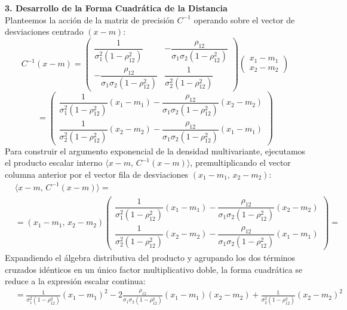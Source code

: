 \begin{ejemplo}[Deducción Explícita para la Dimensión $n = 2$]
\noindent \textbf{3. Desarrollo de la Forma Cuadrática de la Distancia} \\
Planteemos la acción de la matriz de precisión $C^{-1}$ operando sobre el vector de desviaciones centrado $(x-m)$:
\[
C^{-1}(x-m) = \begin{pmatrix} \dfrac{1}{\sigma_1^2 (1 - \rho_{12}^2)} & -\dfrac{\rho_{12}}{\sigma_1 \sigma_2 (1 - \rho_{12}^2)} \\ -\dfrac{\rho_{12}}{\sigma_1 \sigma_2 (1 - \rho_{12}^2)} & \dfrac{1}{\sigma_2^2 (1 - \rho_{12}^2)} \end{pmatrix} \begin{pmatrix} x_1 - m_1 \\ x_2 - m_2 \end{pmatrix}
\]
\[
= \begin{pmatrix} \dfrac{1}{\sigma_1^2 (1 - \rho_{12}^2)}(x_1 - m_1) - \dfrac{\rho_{12}}{\sigma_1 \sigma_2 (1 - \rho_{12}^2)}(x_2 - m_2) \\[0.4cm] \dfrac{1}{\sigma_2^2 (1 - \rho_{12}^2)}(x_2 - m_2) - \dfrac{\rho_{12}}{\sigma_1 \sigma_2 (1 - \rho_{12}^2)}(x_1 - m_1) \end{pmatrix}
\]
Para construir el argumento exponencial de la densidad multivariante, ejecutamos el producto escalar interno $\langle x-m, \, C^{-1}(x-m) \rangle$, premultiplicando el vector columna anterior por el vector fila de desviaciones $(x_1 - m_1, \, x_2 - m_2)$:
\begin{align*}
&\langle x-m, \, C^{-1}(x-m) \rangle = \\
&= (x_1 - m_1, \, x_2 - m_2) \begin{pmatrix} \dfrac{1}{\sigma_1^2 (1 - \rho_{12}^2)}(x_1 - m_1) - \dfrac{\rho_{12}}{\sigma_1 \sigma_2 (1 - \rho_{12}^2)}(x_2 - m_2) \\[0.4cm] \dfrac{1}{\sigma_2^2 (1 - \rho_{12}^2)}(x_2 - m_2) - \dfrac{\rho_{12}}{\sigma_1 \sigma_2 (1 - \rho_{12}^2)}(x_1 - m_1) \end{pmatrix} = 
\end{align*}
Expandiendo el álgebra distributiva del producto y agrupando los dos términos cruzados idénticos en un único factor multiplicativo doble, la forma cuadrática se reduce a la expresión escalar continua:
\begin{align*}
&= \frac{1}{\sigma_1^2 (1 - \rho_{12}^2)} (x_1 - m_1)^2 - 2 \frac{\rho_{12}}{\sigma_1 \sigma_2 (1 - \rho_{12}^2)} (x_1 - m_1)(x_2 - m_2) + \frac{1}{\sigma_2^2 (1 - \rho_{12}^2)} (x_2 - m_2)^2
\end{align*}


\end{ejemplo}
